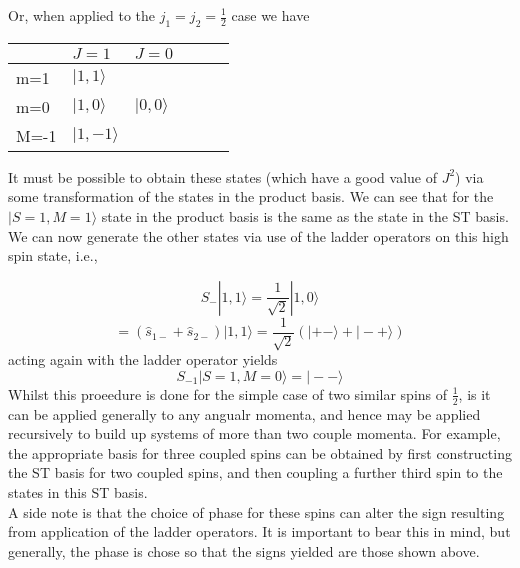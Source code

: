 \documentclass[12pt]{article}
\begin{document}
Or, when applied to the $j_{1} = j_{2} = \frac{1}{2}$ case we have
\begin{table}[]
\begin{tabular}{@{}llllll@{}}
\hline
\multicolumn{1}{l||}{}     &   \multicolumn{1}{l|}{$J= 1 $} & \multicolumn{1}{l}{$J=0$} \\
\hline\hline
\multicolumn{1}{l||}{m=1}  &    \multicolumn{1}{l|}{$|1,1\rangle $} & \multicolumn{1}{l}{}              \\
\multicolumn{1}{l||}{m=0}  &    \multicolumn{1}{l|}{$|1,0\rangle $} & \multicolumn{1}{l}{$|0,0\rangle $}  \\
\multicolumn{1}{l||}{M=-1} &     \multicolumn{1}{l|}{$|1,-1\rangle$} & \multicolumn{1}{l}{}              \\
\end{tabular}
\end{table}
It must be possible to obtain these states (which have a good value of $J^{2}$)
via some transformation of the states in the product basis. We can see that for
the $|S=1,M=1\rangle$ state in the product basis is the same as the state in
the ST basis. We can now generate the other states via use of the ladder
operators on this high spin state, i.e.,

\begin{equation*}
\hat{S}_{-} | 1,1\rangle = \frac{1}{\sqrt{2}}|1,0\rangle 
\end{equation*}
\begin{equation*}
= (\hat{s}_{1-}+\hat{s}_{2-}) | 1,1\rangle = \frac{1}{\sqrt{2}}(|+-\rangle + |-+\rangle)
\end{equation*}
acting again with the ladder operator yields
\begin{equation}
S_{-1}|S=1,M=0\rangle  = |--\rangle
\end{equation}
\noindent Whilst this proeedure is done for the simple case of two similar
spins of $\frac{1}{2}$, is it can be applied generally to any angualr momenta,
and hence may be applied recursively to build up systems of more than two
couple momenta. For example, the appropriate basis for three coupled spins can
be obtained by first constructing the ST basis for two coupled spins, and then
coupling a further third spin to the states in this ST basis.\\

\noindent A side note is that the choice of phase for these spins can alter the
sign resulting from application of the ladder operators. It is important to
bear this in mind, but generally, the phase is chose so that the signs yielded
are those shown above.\\
\end{document}
